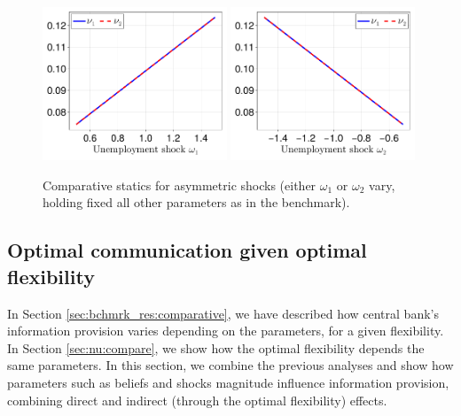 \documentclass[12pt,a4paper]{article}
\begin{document}
\begin{figure}[h!]
\centering
\includegraphics[width=0.49\textwidth]{figures/V9/γ_10/fig_optimal_ν_ω_1.pdf}
\includegraphics[width=0.49\textwidth]{figures/V9/γ_10/fig_optimal_ν_ω_2.pdf}
\caption{Comparative statics for asymmetric shocks (either $\omega_1$ or $\omega_2$ vary, holding fixed all other parameters as in the benchmark).}
\label{Figure6}
\end{figure}

\subsection{Optimal communication given optimal flexibility}
\label{sec:nu:interaction}

In Section \ref{sec:bchmrk_res:comparative}, we have described how central bank's information provision varies depending on the parameters, for a given flexibility. In Section \ref{sec:nu:compare}, we show how the optimal flexibility depends the same parameters. In this section, we combine the previous analyses and show how parameters such as beliefs and shocks magnitude influence information provision, combining direct and indirect (through the optimal flexibility) effects.
\end{document}
